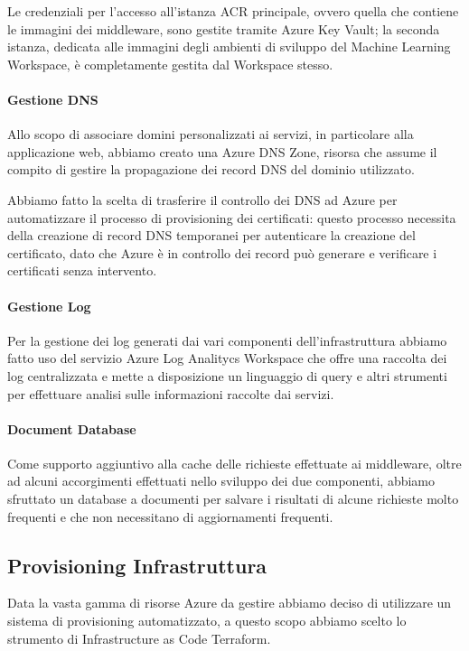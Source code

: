 Le credenziali per l'accesso all'istanza ACR principale, ovvero quella che contiene le immagini dei middleware, sono gestite tramite Azure Key Vault; la seconda istanza, dedicata alle immagini degli ambienti di sviluppo del Machine Learning Workspace, è completamente gestita dal Workspace stesso.

\paragraph{Gestione DNS}
Allo scopo di associare domini personalizzati ai servizi, in particolare alla applicazione web, abbiamo creato una Azure DNS Zone, risorsa che assume il compito di gestire la propagazione dei record DNS del dominio utilizzato.

Abbiamo fatto la scelta di trasferire il controllo dei DNS ad Azure per automatizzare il processo di provisioning dei certificati: questo processo necessita della creazione di record DNS temporanei per autenticare la creazione del certificato, dato che Azure è in controllo dei record può generare e verificare i certificati senza intervento.

\paragraph{Gestione Log}
Per la gestione dei log generati dai vari componenti dell'infrastruttura abbiamo fatto uso del servizio Azure Log Analitycs Workspace che offre una raccolta dei log centralizzata e mette a disposizione un linguaggio di query e altri strumenti per effettuare analisi sulle informazioni raccolte dai servizi.

\paragraph{Document Database}
Come supporto aggiuntivo alla cache delle richieste effettuate ai middleware, oltre ad alcuni accorgimenti effettuati nello sviluppo dei due componenti, abbiamo sfruttato un database a documenti per salvare i risultati di alcune richieste molto frequenti e che non necessitano di aggiornamenti frequenti.

\subsection{Provisioning Infrastruttura}
Data la vasta gamma di risorse Azure da gestire abbiamo deciso di utilizzare un sistema di provisioning automatizzato, a questo scopo abbiamo scelto lo strumento di Infrastructure as Code Terraform.

